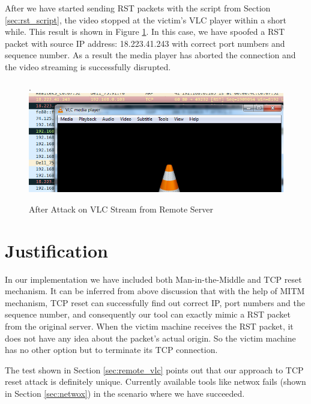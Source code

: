 \documentclass[14pt]{extarticle}
\begin{document}
        After we have started sending RST packets with the script from Section \ref{sec:rst_script}, the video stopped at the victim's VLC player within a short while. This result is shown in Figure \ref{fig:after_remote}. In this case, we have spoofed a RST packet with source IP address: 18.223.41.243 with correct port numbers and sequence number. As a result the media player has aborted the connection and the video streaming is successfully disrupted.
        
        \begin{figure}
 .        \centering
            \includegraphics[width=.95\textwidth]{Pictures/RST_Remote/after.png}
            \caption{After Attack on VLC Stream from Remote Server}
            \label{fig:after_remote}
        \end{figure}    


\section{Justification}
    In our implementation we have included both Man-in-the-Middle and TCP reset mechanism. It can be inferred from above discussion that with the help of MITM mechanism, TCP reset can successfully find out correct IP, port numbers and the sequence number, and consequently our tool can exactly mimic a RST packet from the original server. When the victim machine receives the RST packet, it does not have any idea about the packet's actual origin. So the victim machine has no other option but to terminate its TCP connection. 
    
    The test shown in Section \ref{sec:remote_vlc} points out that our approach to TCP reset attack is definitely unique. Currently available tools like netwox fails (shown in Section \ref{sec:netwox}) in the scenario where we have succeeded.
\end{document}
